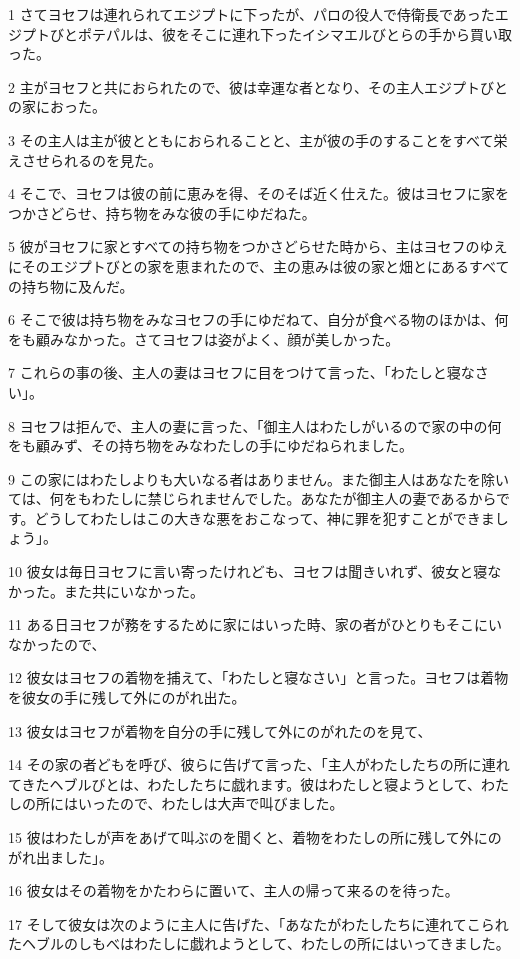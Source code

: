 \par 1 さてヨセフは連れられてエジプトに下ったが、パロの役人で侍衛長であったエジプトびとポテパルは、彼をそこに連れ下ったイシマエルびとらの手から買い取った。
\par 2 主がヨセフと共におられたので、彼は幸運な者となり、その主人エジプトびとの家におった。
\par 3 その主人は主が彼とともにおられることと、主が彼の手のすることをすべて栄えさせられるのを見た。
\par 4 そこで、ヨセフは彼の前に恵みを得、そのそば近く仕えた。彼はヨセフに家をつかさどらせ、持ち物をみな彼の手にゆだねた。
\par 5 彼がヨセフに家とすべての持ち物をつかさどらせた時から、主はヨセフのゆえにそのエジプトびとの家を恵まれたので、主の恵みは彼の家と畑とにあるすべての持ち物に及んだ。
\par 6 そこで彼は持ち物をみなヨセフの手にゆだねて、自分が食べる物のほかは、何をも顧みなかった。さてヨセフは姿がよく、顔が美しかった。
\par 7 これらの事の後、主人の妻はヨセフに目をつけて言った、「わたしと寝なさい」。
\par 8 ヨセフは拒んで、主人の妻に言った、「御主人はわたしがいるので家の中の何をも顧みず、その持ち物をみなわたしの手にゆだねられました。
\par 9 この家にはわたしよりも大いなる者はありません。また御主人はあなたを除いては、何をもわたしに禁じられませんでした。あなたが御主人の妻であるからです。どうしてわたしはこの大きな悪をおこなって、神に罪を犯すことができましょう」。
\par 10 彼女は毎日ヨセフに言い寄ったけれども、ヨセフは聞きいれず、彼女と寝なかった。また共にいなかった。
\par 11 ある日ヨセフが務をするために家にはいった時、家の者がひとりもそこにいなかったので、
\par 12 彼女はヨセフの着物を捕えて、「わたしと寝なさい」と言った。ヨセフは着物を彼女の手に残して外にのがれ出た。
\par 13 彼女はヨセフが着物を自分の手に残して外にのがれたのを見て、
\par 14 その家の者どもを呼び、彼らに告げて言った、「主人がわたしたちの所に連れてきたヘブルびとは、わたしたちに戯れます。彼はわたしと寝ようとして、わたしの所にはいったので、わたしは大声で叫びました。
\par 15 彼はわたしが声をあげて叫ぶのを聞くと、着物をわたしの所に残して外にのがれ出ました」。
\par 16 彼女はその着物をかたわらに置いて、主人の帰って来るのを待った。
\par 17 そして彼女は次のように主人に告げた、「あなたがわたしたちに連れてこられたヘブルのしもべはわたしに戯れようとして、わたしの所にはいってきました。
